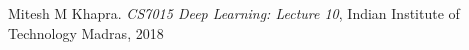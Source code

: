 \documentclass[12pt]{report}
\begin{document}
\begin{thebibliography}{9}
Mitesh M Khapra. \textit{CS7015 Deep Learning: Lecture 10}, 
Indian Institute of Technology Madras, 2018
\end{thebibliography}
\end{document}
